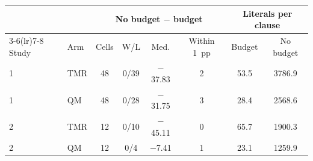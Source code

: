 \begin{tabular}{llcccccc}
\toprule
 & & \multicolumn{4}{c}{No budget $-$ budget} & \multicolumn{2}{c}{Literals per clause} \\
\cmidrule(lr){3-6}\cmidrule(lr){7-8}
Study & Arm & Cells & W/L & Med. & Within 1~pp & Budget & No budget \\
\midrule
1 & TMR & 48 & 0/39 & $-$37.83 & 2 & 53.5 & 3786.9 \\
1 & QM & 48 & 0/28 & $-$31.75 & 3 & 28.4 & 2568.6 \\
2 & TMR & 12 & 0/10 & $-$45.11 & 0 & 65.7 & 1900.3 \\
2 & QM & 12 & 0/4 & $-$7.41 & 1 & 23.1 & 1259.9 \\
\bottomrule
\end{tabular}
